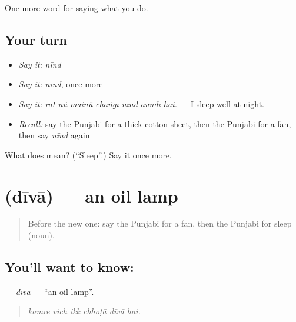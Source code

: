 \begin{grammarlens}[title={What you've built}]
One more word for saying what you do.
\end{grammarlens}

\subsection*{Your turn}
\begin{itemize}
\raggedright
  \item \emph{Say it:} \emph{nīnd}
  \item \emph{Say it:} \emph{nīnd}, once more
  \item \emph{Say it:} \emph{rāt nū̃ mainū̃ chaṅgī nīnd āundī hai.} — I sleep well at night.
  \item \emph{Recall:} say the Punjabi for a thick cotton sheet, then the Punjabi for a fan, then say \emph{nīnd} again
\end{itemize}

\begin{tcolorbox}[breakable,colback=teal!4,colframe=teal!35!black,title={Before you move on}]
What does  mean? (\textquotedblleft{}Sleep\textquotedblright{}.) Say it once more.
\end{tcolorbox}
\section[\texorpdfstring{\pa{ਦੀਵਾ} (dīvā)}{ਦੀਵਾ (dīvā)}]{ (dīvā) — an oil lamp}

\label{lesson:PA-C234-diva}



\begin{quote}
Before the new one: say the Punjabi for a fan, then the Punjabi for sleep (noun).
\end{quote}

\subsection*{You'll want to know: }
\textbf{} — \emph{dīvā} — \textquotedblleft{}an oil lamp\textquotedblright{}.

\begin{quote}
     
\end{quote}

\begin{quote}
\emph{kamre vich ikk chhoṭā dīvā hai.}
\end{quote}

